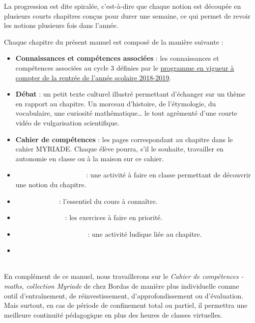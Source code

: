 La progression est dite spiralée, c'est-à-dire que chaque notion est découpée en plusieurs courts chapitres conçus pour durer une semaine, ce qui permet de revoir les notions plusieurs fois dans l'année.

Chaque chapitre du présent manuel est composé de la manière suivante : \\
\begin{itemize}
   \item \textcolor{B2}{\sffamily\bfseries Connaissances et compétences associées} : les connaissances et compétences associées au cycle 3 définies par le \href{https://cache.media.eduscol.education.fr/file/A-Scolarite_obligatoire/37/5/Programme2020_cycle_3_comparatif_1313375.pdf}{programme en vigueur à compter de la rentrée de l'année scolaire 2018-2019}. \\
   \item \textcolor{C1}{\sffamily\bfseries Débat} : un petit texte culturel illustré permettant d'échanger sur un thème en rapport au chapitre. Un morceau d'histoire, de l'étymologie, du vocabulaire, une curiosité mathématique\dots{} le tout agrémenté d'une courte vidéo de vulgarisation scientifique. \\
   \item \textcolor{PartieGeometrie}{\sffamily\bfseries Cahier de compétences} : les pages correspondant au chapitre dans le cahier MYRIADE. Chaque élève pourra, s'il le souhaite, travailler en autonomie en classe ou à la maison sur ce cahier. \\
   \item \colorbox{G2}{\textcolor{white}{\sffamily\bfseries Activité d'approche}} : une activité à faire en classe permettant de découvrir une notion du chapitre. \\
   \item \colorbox{A2}{\textcolor{white}{\sffamily\bfseries Trace écrite}} : l'essentiel du cours à connaître. \\
   \item \colorbox{C2}{\textcolor{white}{\sffamily\bfseries Entraînement}} : les exercices à faire en priorité.  \\   
   \item \colorbox{PartieStatistique}{\textcolor{white}{\sffamily\bfseries Récréation, énigmes}} : une activité ludique liée au chapitre.
   \item
\end{itemize}

\ \\ [10mm]

En complément de ce manuel, nous travaillerons sur le {\it Cahier de compétences - maths, collection Myriade} de chez Bordas de manière plus individuelle comme outil d'entraînement, de réinvestissement, d'approfondissement ou d'évaluation. Mais surtout, en cas de période de confinement total ou partiel, il permettra une meilleure continuité pédagogique en plus des heures de classes virtuelles.



